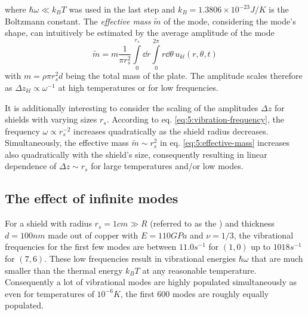 where $\hbar\omega \ll k_B T$ was used in the last step and $k_B = 1.3806\times 10^{-23} \si{J/K}$ is the Boltzmann constant.
The \textit{effective mass} $\tilde{m}$ of the mode, considering the mode's shape, can intuitively be estimated by the average amplitude of the mode 
\begin{equation}\label{eq:5:effective-mass}
  \tilde{m} = m\frac{1}{\pi r_s^2}\int\limits_0^{r_s} \dd r \int\limits_0^{2\pi} r\dd\theta \, u_{kl}(r, \theta, t)
\end{equation}
with $m=\rho \pi r_s^2 d$ being the total mass of the plate.
The amplitude scales therefore as $\Delta z_{kl} \propto \omega^{-1}$ at high temperatures or for low frequencies.

It is additionally interesting to consider the scaling of the amplitudes $\Delta z$ for shields with varying sizes $r_s$.
According to eq. \eqref{eq:5:vibration-frequency}, the frequency $\omega\propto r_s^{-2}$ increases quadratically as the shield radius decreases.
Simultaneously, the effective mass $\tilde{m} \sim r_s^2$ in eq. \eqref{eq:5:effective-mass} increases also quadratically with the shield's size, consequently resulting in linear dependence of $\Delta z \sim r_s$ for large temperatures and/or low modes.




\subsection*{The effect of infinite modes}
For a shield with radius $r_s = 1\si{cm} \gg R$ (referred to as the ) and thickness $d=100\si{nm}$ made out of copper with $E = 110\si{GPa}$ and $\nu = 1/3$, the vibrational frequencies for the first few modes are between $11.0\si{s^{-1}}$ for $(1,0)$ up to $1018\si{s^{-1}}$ for $(7,6)$.
These low frequencies result in vibrational energies $\hbar \omega$ that are much smaller than the thermal energy $k_B T$ at any reasonable temperature.
Consequently a lot of vibrational modes are highly populated simultaneously as even for temperatures of $10^{-6}\si{K}$, the first 600 modes are roughly equally populated.

